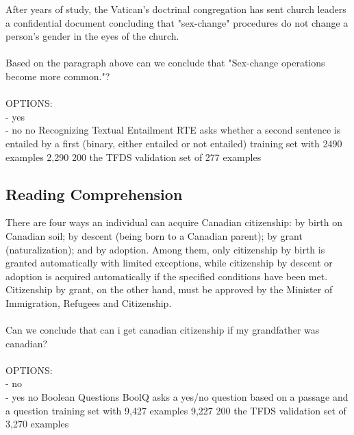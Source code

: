 \taskio
{After years of study, the Vatican's doctrinal congregation has sent church leaders a confidential document concluding that "sex-change" procedures do not change a person's gender in the eyes of the church.\\\\Based on the paragraph above can we conclude that "Sex-change operations become more common."?\\\\OPTIONS:\\- yes\\- no}
{no}
{
    \taskdescription
    {Recognizing Textual Entailment} %
    {RTE} %
    {\citep{10.1007/11736790_9,haim2006second,giampiccolo-etal-2007-third,bentivogli2009fifth}} %
    {asks whether a second sentence is entailed by a first (binary, either entailed or not entailed)} %
    {training set with 2490 examples} %
    {2,290} %
    {200} %
    {the TFDS validation set of 277 examples} %
}

\clearpage 
\subsection{Reading Comprehension}\label{appen:b-reading-comp}

\taskio
{There are four ways an individual can acquire Canadian citizenship: by birth on Canadian soil; by descent (being born to a Canadian parent); by grant (naturalization); and by adoption. Among them, only citizenship by birth is granted automatically with limited exceptions, while citizenship by descent or adoption is acquired automatically if the specified conditions have been met. Citizenship by grant, on the other hand, must be approved by the Minister of Immigration, Refugees and Citizenship.\\\\Can we conclude that can i get canadian citizenship if my grandfather was canadian?\\\\OPTIONS:\\- no\\- yes}
{no}
{
    \taskdescription
    {Boolean Questions} %
    {BoolQ} %
    {\cite{clark-etal-2019-boolq}} %
    {asks a yes/no question based on a passage and a question} %
    {training set with 9,427 examples} %
    {9,227} %
    {200} %
    {the TFDS validation set of 3,270 examples} %
}


